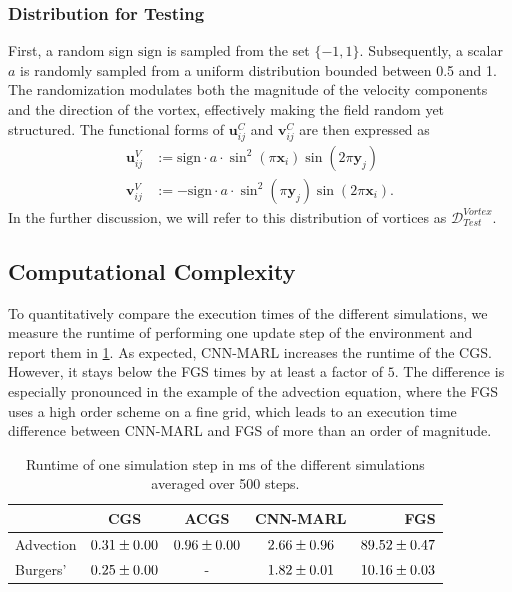 \subsubsection{Distribution for Testing} \label{sec:test_vortices}
First, a random sign \( \text{sign} \) is sampled from the set \(\{-1, 1\}\). Subsequently, a scalar \( a\) is randomly sampled from a uniform distribution bounded between 0.5 and 1. The randomization modulates both the magnitude of the velocity components and the direction of the vortex, effectively making the field random yet structured. The functional forms of \(\boldsymbol u_{ij}^{C}\) and \(\boldsymbol v_{ij}^{C}\) are then expressed as
\begin{align}
    \boldsymbol u_{ij}^{V} &:= \text{sign} \cdot  a \cdot \sin^2(\pi \boldsymbol x_i) \sin(2\pi \boldsymbol y_j) \\
    \boldsymbol v_{ij}^{V} &:= - \text{sign} \cdot a \cdot\sin^2(\pi \boldsymbol y_j) \sin(2\pi \boldsymbol x_i).
\end{align}
In the further discussion, we will refer to this distribution of vortices as $\mathcal D^{Vortex}_{Test}$.

\subsection{Computational Complexity}
To quantitatively compare the execution times of the different simulations, we measure the runtime of performing one update step of the environment and report them in \cref{tab:execution_times}. As expected, CNN-MARL increases the runtime of the CGS. However, it stays below the FGS times by at least a factor of $5$. The difference is especially pronounced in the example of the advection equation, where the FGS uses a high order scheme on a fine grid, which leads to an execution time difference between CNN-MARL and FGS of more than an order of magnitude.
\begin{table}[t] 
\caption{Runtime of one simulation step in ms of the different simulations averaged over 500 steps.}
\label{tab:execution_times}
\vskip 0.15in
\begin{center}
\begin{scriptsize}
\begin{sc}
\begin{tabular}{l|cccr}
\toprule
 & CGS & ACGS & CNN-MARL & FGS \\
\midrule
Advection    & $\tiny 0.31 \pm 0.00$& $\tiny 0.96 \pm 0.00$& $\tiny 2.66 \pm 0.96$ & $\tiny 89.52 \pm 0.47$ \\
Burgers' & $\tiny 0.25 \pm 0.00$ & -& $\tiny 1.82 \pm 0.01$ & $\tiny 10.16 \pm 0.03$\\
\bottomrule
\end{tabular}
\end{sc}
\end{scriptsize}
\end{center}
\vskip -0.1in
\end{table}

